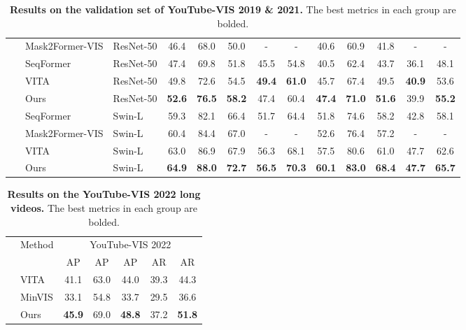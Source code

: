 \documentclass[10pt,twocolumn,letterpaper]{article}
\begin{document}
\begin{table*}[t]
\begin{tabular}{l|l|l|ccccc|ccccc}
	~ & Mask2Former-VIS \cite{mask2formervis}& ResNet-50 & 46.4 & 68.0 & 50.0 & - & - & 40.6 & 60.9 & 41.8 & - & -\\
	~ & SeqFormer \cite{seqformer}& ResNet-50 & 47.4 & 69.8 & 51.8 & 45.5 & 54.8 & 40.5 & 62.4 & 43.7 & 36.1 & 48.1 \\
	~ & VITA \cite{vita}& ResNet-50 & 49.8 & 72.6 & 54.5 & \textbf{49.4} & \textbf{61.0} & 45.7 & 67.4 & 49.5 & \textbf{40.9} & 53.6 \\
~ & Ours & ResNet-50 & \textbf{52.6} & \textbf{76.5} & \textbf{58.2} & 47.4 & 60.4 & \textbf{47.4} & \textbf{71.0} & \textbf{51.6} & 39.9 & \textbf{55.2} \\
	\cline{2-13}
	~ & SeqFormer \cite{seqformer}& Swin-L & 59.3 & 82.1 & 66.4 & 51.7 & 64.4 & 51.8 & 74.6 & 58.2 & 42.8 & 58.1 \\
	~ & Mask2Former-VIS \cite{mask2formervis}& Swin-L & 60.4 & 84.4 & 67.0 & - & - & 52.6 & 76.4 & 57.2 & - & - \\
	~ & VITA \cite{vita}& Swin-L & 63.0 & 86.9 & 67.9 & 56.3 & 68.1 & 57.5 & 80.6 & 61.0 & 47.7 & 62.6 \\
~ & Ours & Swin-L & \textbf{64.9} & \textbf{88.0} & \textbf{72.7} & \textbf{56.5} & \textbf{70.3} & \textbf{60.1} & \textbf{83.0} & \textbf{68.4} & \textbf{47.7} & \textbf{65.7} \\
\hline
 \end{tabular}
 \caption{\textbf{Results on the validation set of YouTube-VIS 2019 \& 2021.} The best metrics in each group are bolded.}\vspace{-5mm}
 \label{tab:ytvis}
\end{table*}
\begin{table}[t]
\centering
\begin{tabular}{l|l|ccccc}
	\multirow{2}{*}{} & \multicolumn{1}{c|}{\multirow{2}{*}{Method}} & \multicolumn{5}{c}{YouTube-VIS 2022} \\
	~ & \multicolumn{1}{c|}{~} & AP &  AP & AP & AR & AR  \\
	\hline
	\multirow{3}{*}{\rotatebox{90}{Swin-L}} & VITA \cite{vita}  & 41.1 & 63.0 & 44.0 & 39.3 & 44.3 \\
	~ & MinVIS \cite{minvis} &  33.1 & 54.8 & 33.7 & 29.5 & 36.6\\
~ &  Ours & \textbf{45.9} & 69.0 & \textbf{48.8} & 37.2 & \textbf{51.8} \\
\hline
 \end{tabular}\vspace{1mm}
 \caption{\textbf{Results on the YouTube-VIS 2022 long videos.} The best metrics in each group are bolded.}\vspace{-4mm}
 \label{tab:ytvis22}
\end{table}
\end{document}
